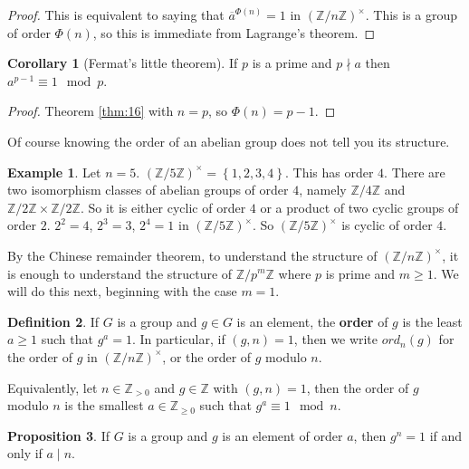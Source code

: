 \documentclass{article}
\newcommand{\Z}{\mathbb{Z}}
\newcommand{\rb}[1]{\left( #1 \right)}
\newcommand{\cb}[1]{\left\{ #1 \right\}}
\newcommand{\unit}[1]{\rb{\Z / #1\Z}^\times}
\theoremstyle{definition}\newtheorem{definition}{Definition}
\theoremstyle{definition}\newtheorem*{remark}{Remark}
\theoremstyle{definition}\newtheorem*{example}{Example}
\theoremstyle{definition}\newtheorem*{note}{Note}
\newtheorem{proposition}[definition]{Proposition}
\newtheorem{corollary}[definition]{Corollary}
\begin{document}
\begin{proof}
This is equivalent to saying that $ \overline{a}^{\Phi\rb{n}} = 1 $ in $ \unit{n} $. This is a group of order $ \Phi\rb{n} $, so this is immediate from Lagrange's theorem.
\end{proof}

\begin{corollary}[Fermat's little theorem]
If $ p $ is a prime and $ p \nmid a $ then $ a^{p - 1} \equiv 1 \mod p $.
\end{corollary}

\begin{proof}
Theorem \ref{thm:16} with $ n = p $, so $ \Phi\rb{n} = p - 1 $.
\end{proof}

Of course knowing the order of an abelian group does not tell you its structure.

\begin{example}
Let $ n = 5 $. $ \unit{5} = \cb{1, 2, 3, 4} $. This has order $ 4 $. There are two isomorphism classes of abelian groups of order $ 4 $, namely $ \Z / 4\Z $ and $ \Z / 2\Z \times \Z / 2\Z $. So it is either cyclic of order $ 4 $ or a product of two cyclic groups of order $ 2 $. $ 2^2 = 4 $, $ 2^3 = 3 $, $ 2^4 = 1 $ in $ \unit{5} $. So $ \unit{5} $ is cyclic of order $ 4 $.
\end{example}

By the Chinese remainder theorem, to understand the structure of $ \unit{n} $, it is enough to understand the structure of $ \Z / p^m\Z $ where $ p $ is prime and $ m \ge 1 $. We will do this next, beginning with the case $ m = 1 $.


\begin{definition}
If $ G $ is a group and $ g \in G $ is an element, the \textbf{order} of $ g $ is the least $ a \ge 1 $ such that $ g^a = 1 $. In particular, if $ \rb{g, n} = 1 $, then we write $ ord_n\rb{g} $ for the order of $ g $ in $ \unit{n} $, or the order of $ g $ modulo $ n $.
\end{definition}

Equivalently, let $ n \in \Z_{> 0} $ and $ g \in \Z $ with $ \rb{g, n} = 1 $, then the order of $ g $ modulo $ n $ is the smallest $ a \in \Z_{\ge 0} $ such that $ g^a \equiv 1 \mod n $.

\begin{proposition}
\label{prop:19}
If $ G $ is a group and $ g $ is an element of order $ a $, then $ g^n = 1 $ if and only if $ a \mid n $.
\end{proposition}
\end{document}
